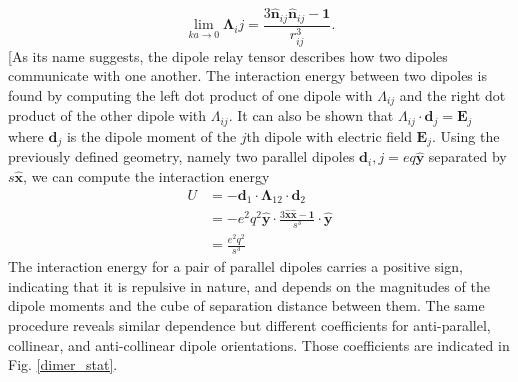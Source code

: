 \documentclass [11pt, proquest] {uwthesis}[2016/11/22]
\begin{document}
\begin{equation}
\lim_{ka \to 0}\boldsymbol{\Lambda}_ij =  \frac{3\hat{\textbf{n}}_{ij}\hat{\textbf{n}}_{ij} - \textbf{1}}{r_{ij}^3}.
\end{equation}
[As its name suggests, the dipole relay tensor describes how two dipoles communicate with one another. The interaction energy between two dipoles is found by computing the left dot product of one dipole with $\Lambda_{ij}$ and the right dot product of the other dipole with $\Lambda_{ij}$. It can also be shown that $\Lambda_{ij}\cdot\textbf{d}_j = \textbf{E}_j$ where $\textbf{d}_j$ is the dipole moment of the $j$th dipole with electric field $\textbf{E}_j$. Using the previously defined geometry, namely two parallel dipoles $\textbf{d}_i,j = eq\hat{\textbf{y}}$ separated by $s\hat{\textbf{x}}$, we can compute the interaction energy
\begin{equation}
\begin{split}
U &= -\textbf{d}_1\cdot\boldsymbol{\Lambda}_{12}\cdot\textbf{d}_2\\
&= -e^2q^2\hat{\textbf{y}}\cdot\frac{3\hat{\textbf{x}}\hat{\textbf{x}} - \textbf{1}}{s^3}\cdot\hat{\textbf{y}}\\
&= \frac{e^2q^2}{s^3}
\label{quasi_int}
\end{split}
\end{equation}
The interaction energy for a pair of parallel dipoles carries a positive sign, indicating that it is repulsive in nature, and depends on the magnitudes of the dipole moments and the cube of separation distance between them. The same procedure reveals similar dependence but different coefficients for anti-parallel, collinear, and anti-collinear dipole orientations. Those coefficients are indicated in Fig. \ref{dimer_stat}.
\end{document}
